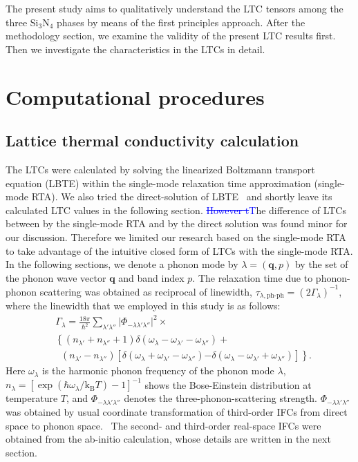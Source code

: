 \documentclass[twocolumn,amsmath,amssymb,a4paper,prb,superscriptaddress,floatfix]{revtex4-1}
\begin{document}
The present study aims to qualitatively understand the LTC tensors among the
three Si$_3$N$_4$ phases by means of the first principles approach.  After the
methodology section, we examine the validity of the present LTC results first.
Then we investigate the characteristics in the LTCs in detail.

\section{Computational procedures}
\subsection{Lattice thermal conductivity calculation}
The LTCs were calculated by solving the linearized Boltzmann transport equation
(LBTE) within the single-mode relaxation time approximation (single-mode RTA).
We also tried the direct-solution of LBTE~\cite{chaput-direct} and shortly
leave its calculated LTC values in the following section. \textcolor{blue}{\sout{However t}T}he
difference of LTCs between by the single-mode RTA and by the direct solution
was found minor for our discussion. Therefore we limited our research based on
the single-mode RTA to take advantage of the intuitive closed form of LTCs with
the single-mode RTA.  In the following sections, we denote a phonon mode by
$\lambda=(\mathbf{q},p)$ by the set of the phonon wave vector $\mathbf{q}$ and
band index $p$. The relaxation time due to phonon-phonon scattering was
obtained as reciprocal of linewidth,
$\tau_{\lambda,\text{ph-ph}}=(2\Gamma_\lambda)^{-1}$, where the linewidth that
we employed in this study is as follows:
\begin{align}
 \label{eq:linewidth}
 &\Gamma_\lambda = \frac{18\pi}{\hbar^2}
  \sum_{\lambda' \lambda''}
  \bigl|\Phi_{-\lambda\lambda'\lambda''}\bigl|^2 \times \nonumber \\ 
 &\left\{ (n_{\lambda'} + n_{\lambda''}+1) 
   \delta(\omega_\lambda-\omega_{\lambda'}-\omega_{\lambda''}) \right.
   + \nonumber \\ 
 &\;\;(n_{\lambda'}-n_{\lambda''})
  \left[\delta(\omega_\lambda +\omega_{\lambda'}-\omega_{\lambda''})
 \right. 
 \left. -\left. \delta(\omega_\lambda - \omega_{\lambda'}+\omega_{\lambda''})
 \right]\right\}.
\end{align}
Here $\omega_\lambda$ is the harmonic phonon frequency of the phonon mode
$\lambda$, $n_\lambda=[\exp(\hbar\omega_\lambda/\mathrm{k_B}T)-1]^{-1}$ shows
the Bose-Einstein distribution at temperature $T$, and
$\Phi_{-\lambda\lambda'\lambda''}$ denotes the three-phonon-scattering strength.
$\Phi_{-\lambda\lambda'\lambda''}$ was obtained by usual coordinate
transformation of third-order IFCs from direct space to phonon
space.~\cite{phono3py} The second- and third-order real-space IFCs
were obtained from the ab-initio calculation, whose details are written in the
next section.
\end{document}
